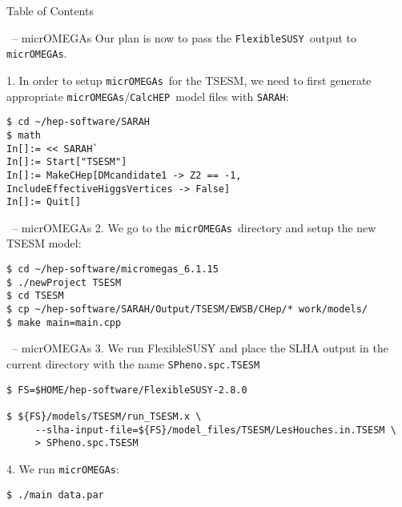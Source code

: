 \documentclass[11pt]{beamer}
\newcommand{\CalcHEP}{\texttt{CalcHEP}}
\newcommand{\FlexibleSUSY}{\texttt{FlexibleSUSY}}
\newcommand{\micrOMEGAs}{\texttt{micrOMEGAs}}
\newcommand{\SARAH}{\texttt{SARAH}}
\begin{document}

\begin{frame}{Table of Contents}
\end{frame}


\begin{frame}[fragile]{\insertsection\ -- micrOMEGAs}
  Our plan is now to pass the \FlexibleSUSY\ output to \micrOMEGAs.

  \medskip

  1. In order to setup \micrOMEGAs\ for the TSESM, we need to first
  generate appropriate \micrOMEGAs/\CalcHEP\ model files with \SARAH:
  \begin{lstlisting}
$ cd ~/hep-software/SARAH
$ math
In[]:= << SARAH`
In[]:= Start["TSESM"]
In[]:= MakeCHep[DMcandidate1 -> Z2 == -1, IncludeEffectiveHiggsVertices -> False]
In[]:= Quit[]\end{lstlisting}%
\end{frame}


\begin{frame}[fragile]{\insertsection\ -- micrOMEGAs}
  2. We go to the \micrOMEGAs\ directory and setup the new TSESM
  model:
  \begin{lstlisting}
$ cd ~/hep-software/micromegas_6.1.15
$ ./newProject TSESM
$ cd TSESM
$ cp ~/hep-software/SARAH/Output/TSESM/EWSB/CHep/* work/models/
$ make main=main.cpp\end{lstlisting}%
\end{frame}


\begin{frame}[fragile]{\insertsection\ -- micrOMEGAs}
  3. We run FlexibleSUSY and place the SLHA output in the current
  directory with the name \texttt{SPheno.spc.TSESM}
  \begin{lstlisting}
$ FS=$HOME/hep-software/FlexibleSUSY-2.8.0

$ ${FS}/models/TSESM/run_TSESM.x \
     --slha-input-file=${FS}/model_files/TSESM/LesHouches.in.TSESM \
     > SPheno.spc.TSESM\end{lstlisting}%
  4. We run \micrOMEGAs:
  \begin{lstlisting}
$ ./main data.par\end{lstlisting}%
\end{frame}
\end{document}
